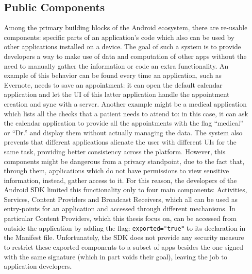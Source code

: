\subsection{Public Components}
\label{sc:exportedcomponents}
Among the primary building blocks of the Android ecosystem, there are re-usable components: specific parts of an application's code which also can be used by other applications installed on a device. The goal of such a system is to provide developers a way to make use of data and computation of other apps without the need to manually gather the information or code an extra functionality. An example of this behavior can be found every time an application, such as Evernote, needs to save an appointment: it can open the default calendar application and let the UI of this latter application handle the appointment creation and sync with a server. Another example might be a medical application which lists all the checks that a patient needs to attend to: in this case, it can ask the calendar application to provide all the appointments with the flag \enquote{medical} or \enquote{Dr.} and display them without actually managing the data. The system also prevents that different applications alienate the user with different UIs for the same task, providing better consistency across the platform. However, this components might be dangerous from a privacy standpoint, due to the fact that, through them, applications which do not have permissions to view sensitive information, instead, gather access to it. For this reason, the developers of the Android SDK limited this functionality only to four main components: Activities, Services, Content Providers and Broadcast Receivers, which all can be used as entry-points for an application and accessed through different mechanisms. In particular Content Providers, which this thesis focus on, can be accessed from outside the application by adding the flag: \texttt{exported="true"} to its declaration in the Manifest file. Unfortunately, the SDK does not provide any security measure to restrict these exported components to a subset of apps besides the one signed with the same signature (which in part voids their goal), leaving the job to application developers. 


